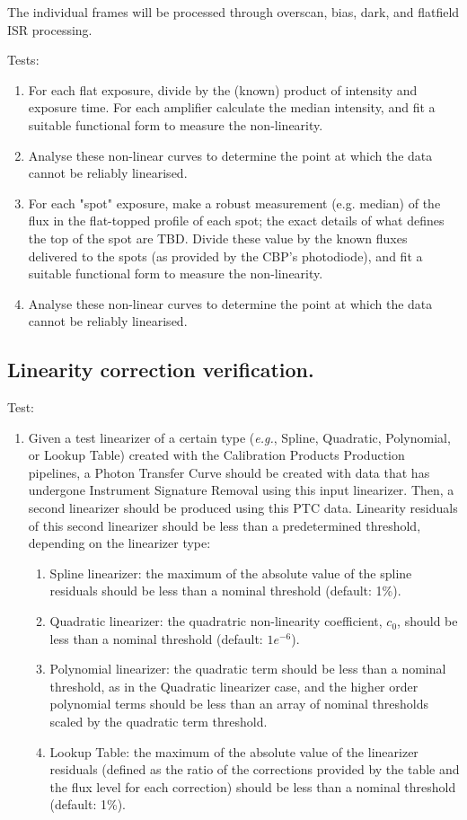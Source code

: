 \documentclass[DM,authoryear,toc,lsstdraft]{lsstdoc}
\begin{document}
The individual frames will be processed through overscan, bias, dark, and flatfield ISR processing.

Tests:
\begin{enumerate}
\item For each flat exposure, divide by the (known) product of intensity and exposure time.
For each amplifier calculate the median intensity, and fit a suitable functional form
to measure the non-linearity.
\item Analyse these non-linear curves to determine the point at which the data cannot be reliably
linearised.
\item For each "spot" exposure, make a robust measurement (e.g. median) of the flux in the flat-topped profile of
each spot; the exact details of what defines the top of the spot are TBD.  Divide these value by the known
fluxes delivered to the spots (as provided by the CBP's photodiode), and fit a suitable functional form to
measure the non-linearity.
\item Analyse these non-linear curves to determine the point at which the data cannot be reliably
linearised.
\end{enumerate}


\subsection{Linearity correction verification.}

Test:
\begin{enumerate}
	\item Given a test linearizer of a certain type (\emph{e.g.}, Spline, Quadratic, Polynomial, or Lookup Table) created with the Calibration Products Production pipelines, a Photon Transfer Curve should be created with data that has undergone Instrument Signature Removal using this input linearizer. Then, a second linearizer should be produced using this PTC data. Linearity residuals of this second linearizer should be less than a predetermined threshold, depending on the linearizer type:
		\begin{enumerate}
			\item Spline linearizer: the maximum of the absolute value of the spline residuals should be less than a nominal threshold (default: 1\%).
			\item Quadratic linearizer: the quadratric non-linearity coefficient, $c_0$, should be less than a nominal threshold (default: $1e^{-6}$).
			\item Polynomial linearizer: the quadratic term should be less than a nominal threshold, as in the Quadratic linearizer case, and the higher order polynomial terms should be less than an array of nominal thresholds scaled by the quadratic term threshold.
			\item Lookup Table: the maximum of the absolute value of the linearizer residuals (defined as the ratio of the corrections provided by the table and the flux level for each correction) should be less than a nominal threshold (default: 1\%).
		\end{enumerate}

\end{enumerate}
\end{document}
